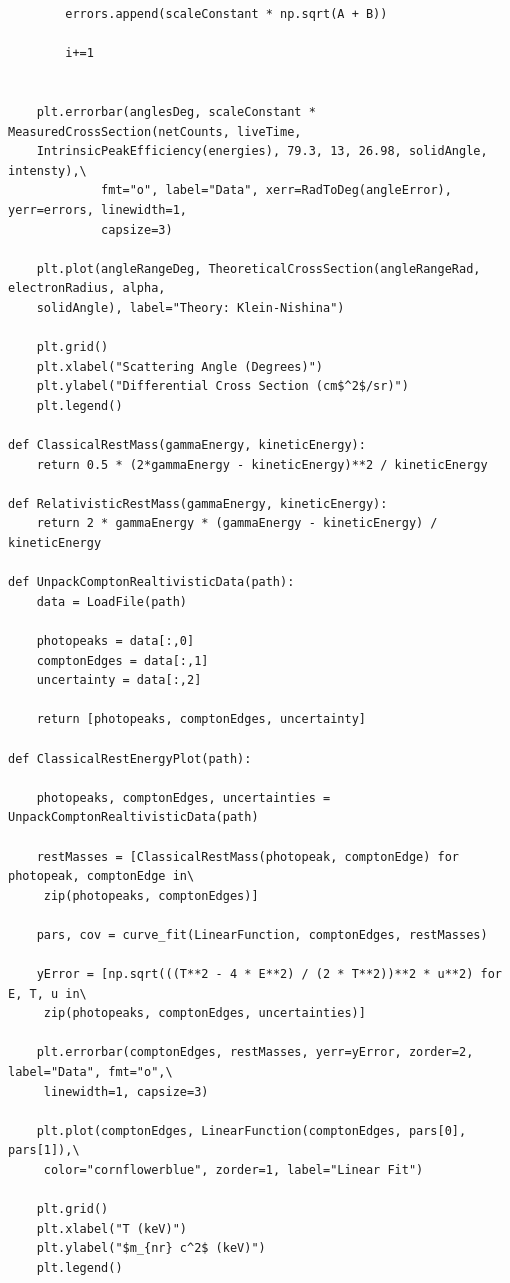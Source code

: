 \documentclass[%
reprint,
amsmath,amssymb,
aps,
floatfix
]{revtex4-2}
\begin{document}
\begin{lstlisting}
        errors.append(scaleConstant * np.sqrt(A + B))
        
        i+=1


    plt.errorbar(anglesDeg, scaleConstant * MeasuredCrossSection(netCounts, liveTime, 
    IntrinsicPeakEfficiency(energies), 79.3, 13, 26.98, solidAngle, intensty),\
             fmt="o", label="Data", xerr=RadToDeg(angleError), yerr=errors, linewidth=1, 
             capsize=3)
    
    plt.plot(angleRangeDeg, TheoreticalCrossSection(angleRangeRad, electronRadius, alpha, 
    solidAngle), label="Theory: Klein-Nishina")
    
    plt.grid()
    plt.xlabel("Scattering Angle (Degrees)")
    plt.ylabel("Differential Cross Section (cm$^2$/sr)")
    plt.legend()
    
def ClassicalRestMass(gammaEnergy, kineticEnergy):
    return 0.5 * (2*gammaEnergy - kineticEnergy)**2 / kineticEnergy

def RelativisticRestMass(gammaEnergy, kineticEnergy):
    return 2 * gammaEnergy * (gammaEnergy - kineticEnergy) / kineticEnergy
    
def UnpackComptonRealtivisticData(path):
    data = LoadFile(path)

    photopeaks = data[:,0]
    comptonEdges = data[:,1]
    uncertainty = data[:,2]

    return [photopeaks, comptonEdges, uncertainty]
    
def ClassicalRestEnergyPlot(path):

    photopeaks, comptonEdges, uncertainties = UnpackComptonRealtivisticData(path)

    restMasses = [ClassicalRestMass(photopeak, comptonEdge) for photopeak, comptonEdge in\
     zip(photopeaks, comptonEdges)]

    pars, cov = curve_fit(LinearFunction, comptonEdges, restMasses)

    yError = [np.sqrt(((T**2 - 4 * E**2) / (2 * T**2))**2 * u**2) for E, T, u in\
     zip(photopeaks, comptonEdges, uncertainties)]

    plt.errorbar(comptonEdges, restMasses, yerr=yError, zorder=2, label="Data", fmt="o",\
     linewidth=1, capsize=3)

    plt.plot(comptonEdges, LinearFunction(comptonEdges, pars[0], pars[1]),\
     color="cornflowerblue", zorder=1, label="Linear Fit")

    plt.grid()
    plt.xlabel("T (keV)")
    plt.ylabel("$m_{nr} c^2$ (keV)")
    plt.legend()
    

\end{lstlisting}
\end{document}
